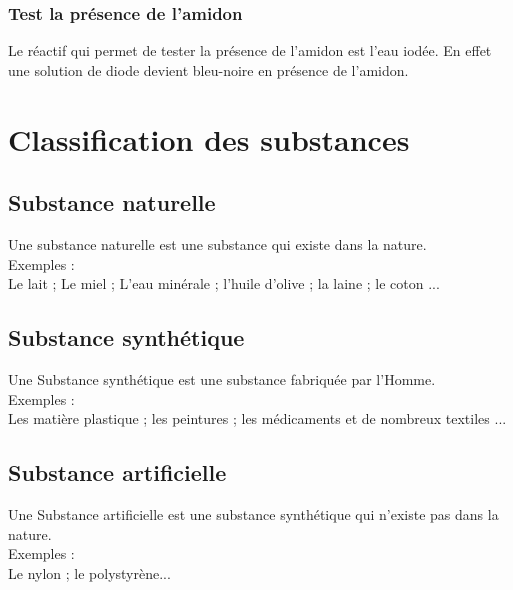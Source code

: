 \documentclass[12pt,a4paper]{book}
\begin{document}
{\subsubsection{Test la présence de l'amidon}
\noindent
Le réactif qui permet de tester la présence de l'amidon est l'eau iodée. En effet une solution de diode devient bleu-noire en présence de l'amidon.
\begin{center}
\end{center}
\section{Classification des substances}
\subsection{Substance naturelle}
\noindent
Une substance naturelle est une substance qui existe dans la nature.\\
Exemples :\\
Le lait ; Le miel ; L'eau minérale ; l'huile d'olive ; la laine ; le coton ...
\subsection{Substance synthétique}
\noindent
Une Substance synthétique est une substance fabriquée par l'Homme.\\
Exemples :\\
Les matière plastique ; les peintures ; les médicaments et de nombreux textiles ...
\subsection{Substance artificielle}
\noindent
Une Substance artificielle est une substance synthétique qui n'existe pas dans la nature.\\
Exemples :\\
Le nylon ; le polystyrène...}
\end{document}
